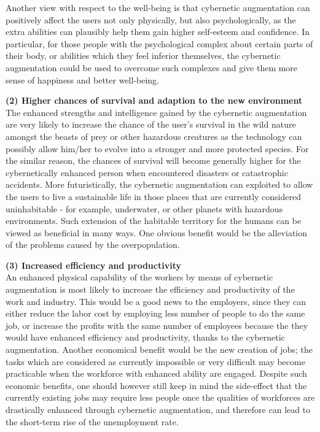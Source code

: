 Another view with respect to the well-being is that cybernetic augmentation can positively affect the users not only physically, but also psychologically, as the extra abilities can plausibly help them gain higher self-esteem and confidence. In particular, for those people with the psychological complex about certain parts of their body, or abilities which they feel inferior themselves, the cybernetic augmentation could be used to overcome such complexes and give them more sense of happiness and better well-being.

{\bf (2) Higher chances of survival and adaption to the new environment} \\
The enhanced strengths and intelligence gained by the cybernetic augmentation are very likely to increase the chance of the user's survival in the wild nature amongst the beasts of prey or other hazardous creatures as the technology can possibly allow him/her to evolve into a stronger and more protected species. For the similar reason, the chances of survival will become generally higher for the cybernetically enhanced person when encountered disasters or catastrophic accidents. More futuristically, the cybernetic augmentation can exploited to allow the users to live a sustainable life in those places that are currently considered uninhabitable - for example, underwater, or other planets with hazardous environments. Such extension of the habitable territory for the humans can be viewed as beneficial in many ways. One obvious benefit would be the alleviation of the problems caused by the overpopulation.

{\bf (3) Increased efficiency and productivity}\\
An enhanced physical capability of the workers by means of cybernetic augmentation is most likely to increase the efficiency and productivity of the work and industry. This would be a good news to the employers, since they can either reduce the labor cost by employing less number of people to do the same job, or increase the profits with the same number of employees because the they would have enhanced efficiency and productivity, thanks to the cybernetic augmentation. Another economical benefit would be the new creation of jobs; the tasks which are considered as currently impossible or very difficult may become practicable when the workforce with enhanced ability are engaged. Despite such economic benefits, one should however still keep in mind the side-effect that the currently existing jobs may require less people once the qualities of workforces are drastically enhanced through cybernetic augmentation, and therefore can lead to the short-term rise of the unemployment rate.

